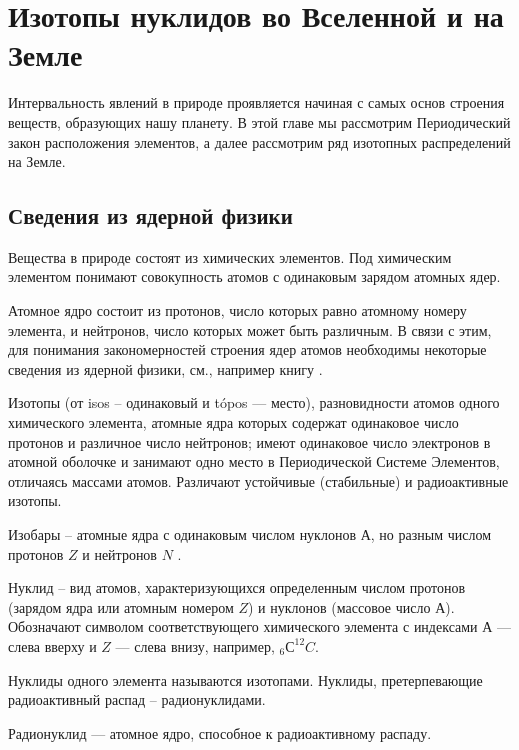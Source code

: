 \documentclass[a5paper,openany]{book}
\begin{document}

\chapter{Изотопы нуклидов во Вселенной и на Земле}\label{s:IntNature}

Интервальность явлений в природе проявляется начиная с самых основ строения веществ, образующих нашу планету. В этой главе мы рассмотрим Периодический закон расположения элементов, а далее рассмотрим ряд изотопных распределений на Земле.


\section{Сведения из ядерной физики}\label{s:NuclPhys} 

Вещества в природе состоят из химических элементов.
Под химическим элементом понимают совокупность атомов с одинаковым зарядом атомных ядер. 

Атомное ядро состоит из протонов, число которых равно атомному номеру элемента, и нейтронов, число которых может быть различным.  В связи с этим, для понимания закономерностей строения ядер атомов необходимы некоторые сведения из ядерной физики, см., например книгу \cite{NuclPhys}.

Изотопы (от isos – одинаковый и tópos — место), разновидности атомов одного химического элемента,
атомные ядра которых содержат одинаковое число протонов и различное число нейтронов; имеют одинаковое
число электронов в атомной оболочке и занимают одно место в Периодической Системе Элементов, отличаясь
массами атомов. Различают устойчивые (стабильные) и радиоактивные изотопы. 

Изобары –  атомные ядра с одинаковым числом нуклонов $А$, но разным числом протонов $Z$  и нейтронов $N$ .

Нуклид – вид атомов, характеризующихся определенным числом протонов (зарядом ядра или атомным номером 
$Z$) и нуклонов (массовое число $А$).   Обозначают символом соответствующего химического элемента с индексами $А$ --- слева вверху и $Z$ --- слева внизу, например, $_6С^{12}C$.

Нуклиды одного элемента называются изотопами. Нуклиды, претерпевающие радиоактивный распад – радионуклидами.

Радионуклид ---  атомное ядро, способное к радиоактивному распаду. 
\end{document}

